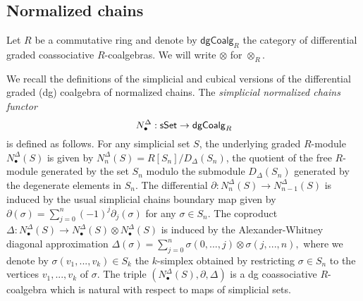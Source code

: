 \subsection{Normalized chains} Let $R$ be a commutative ring and denote by $\mathsf{dgCoalg}_R$ the category of differential graded coassociative $R$-coalgebras. We will write $\otimes$ for $\otimes_R$.

We recall the definitions of the simplicial and cubical versions of the differential graded (dg) coalgebra of normalized chains. The \textit{simplicial normalized chains functor} $$N^{\Delta}_\bullet: \mathsf{sSet} \to \mathsf{dgCoalg}_R$$ is defined as follows. For any simplicial set $S$, the underlying graded $R$-module $N^{\Delta}_\bullet(S)$ is given by $N^{\Delta}_n(S)= R[S_n] / D_{\Delta} (S_n)$, the quotient of the free $R$-module generated by the set $S_n$ modulo the submodule $D_{\Delta} (S_n)$ generated by the degenerate elements in $S_n$. The differential $\partial: N^{\Delta}_n(S) \to N^{\Delta}_{n-1}(S)$ is induced by the usual simplicial chains boundary map given by $\partial(\sigma)= \sum_{j=0}^n (-1)^j \partial_j(\sigma)$ for any $\sigma \in S_n.$ The coproduct $\Delta: N^{\Delta}_\bullet(S) \to N^{\Delta}_\bullet(S) \otimes N^{\Delta}_\bullet(S)$ is induced by the Alexander-Whitney diagonal approximation
$\Delta(\sigma)= \sum_{j=0}^n \sigma(0,...,j) \otimes \sigma(j,...,n),$
where we denote by $\sigma(v_1,...,v_k) \in S_k$ the $k$-simplex obtained by restricting $\sigma \in S_n$ to the vertices $v_1,...,v_k$ of $\sigma$.
The triple $(N^{\Delta}_\bullet(S), \partial, \Delta)$ is a dg coassociative $R$-coalgebra which is natural with respect to maps of simplicial sets. 


